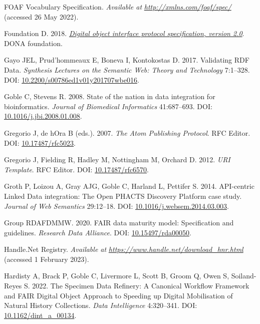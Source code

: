 \begin{CSLReferences}{1}{0}
\leavevmode{}%
FOAF Vocabulary Specification. \emph{Available at} \href{http://xmlns.com/foaf/spec/}{\emph{http://xmlns.com/foaf/spec/}} (accessed 26 May 2022).

\leavevmode{}%
Foundation D. 2018. \emph{\href{https://hdl.handle.net/0.DOIP/DOIPV2.0}{Digital object interface protocol specification, version 2.0}}. DONA foundation.

\leavevmode{}%
Gayo JEL, Prud'hommeaux E, Boneva I, Kontokostas D. 2017. Validating RDF Data. \emph{Synthesis Lectures on the Semantic Web: Theory and Technology} 7:1--328. DOI: \href{https://doi.org/10.2200/s00786ed1v01y201707wbe016}{10.2200/s00786ed1v01y201707wbe016}.

\leavevmode{}%
Goble C, Stevens R. 2008. State of the nation in data integration for bioinformatics. \emph{Journal of Biomedical Informatics} 41:687--693. DOI: \href{https://doi.org/10.1016/j.jbi.2008.01.008}{10.1016/j.jbi.2008.01.008}.

\leavevmode{}%
Gregorio J, de hOra B (eds.). 2007. \emph{The Atom Publishing Protocol}. RFC Editor. DOI: \href{https://doi.org/10.17487/rfc5023}{10.17487/rfc5023}.

\leavevmode{}%
Gregorio J, Fielding R, Hadley M, Nottingham M, Orchard D. 2012. \emph{URI Template}. RFC Editor. DOI: \href{https://doi.org/10.17487/rfc6570}{10.17487/rfc6570}.

\leavevmode{}%
Groth P, Loizou A, Gray AJG, Goble C, Harland L, Pettifer S. 2014. API-centric Linked Data integration: The Open PHACTS Discovery Platform case study. \emph{Journal of Web Semantics} 29:12--18. DOI: \href{https://doi.org/10.1016/j.websem.2014.03.003}{10.1016/j.websem.2014.03.003}.

\leavevmode{}%
Group RDAFDMMW. 2020. FAIR data maturity model: Specification and guidelines. \emph{Research Data Alliance}. DOI: \href{https://doi.org/10.15497/rda00050}{10.15497/rda00050}.

\leavevmode{}%
Handle.Net Registry. \emph{Available at} \href{https://www.handle.net/download_hnr.html}{\emph{https://www.handle.net/download\_hnr.html}} (accessed 1 February 2023).

\leavevmode{}%
Hardisty A, Brack P, Goble C, Livermore L, Scott B, Groom Q, Owen S, Soiland-Reyes S. 2022. The Specimen Data Refinery: A Canonical Workflow Framework and FAIR
Digital Object Approach to Speeding up Digital Mobilisation of Natural History
Collections. \emph{Data Intelligence} 4:320--341. DOI: \href{https://doi.org/10.1162/dint_a_00134}{10.1162/dint\_a\_00134}.


\end{CSLReferences}
